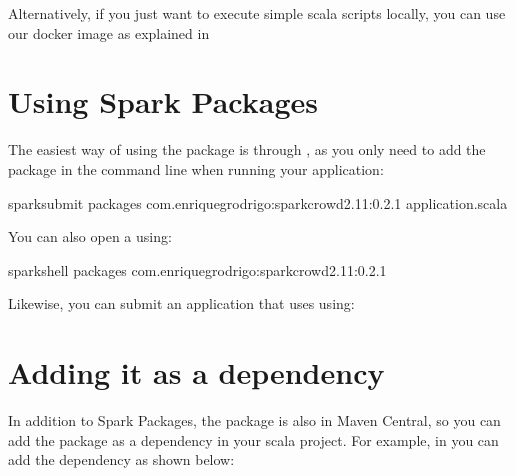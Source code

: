 \documentclass[letterpaper,10pt,english]{sphinxmanual}
\begin{document}
Alternatively, if you just want to execute simple scala scripts locally,
you can use our docker image as explained in {\hyperref[\detokenize{usage/quickstart:quickstart}]{}}


\section{Using Spark Packages}
\label{\detokenize{usage/installation:using-spark-packages}}
The easiest way of using the package is through , as you only need to add the package in the command line when running your
application:

%
\begin{sphinxVerbatim}[commandchars=\\\{\}]
spark\PYGZhy{}submit \PYGZhy{}\PYGZhy{}packages com.enriquegrodrigo:spark\PYGZhy{}crowd\PYGZus{}2.11:0.2.1 application.scala
\end{sphinxVerbatim}

You can also open a  using:

%
\begin{sphinxVerbatim}[commandchars=\\\{\}]
spark\PYGZhy{}shell \PYGZhy{}\PYGZhy{}packages com.enriquegrodrigo:spark\PYGZhy{}crowd\PYGZus{}2.11:0.2.1
\end{sphinxVerbatim}

Likewise, you can submit an application that uses  using:


\section{Adding it as a dependency}
\label{\detokenize{usage/installation:adding-it-as-a-dependency}}
In addition to Spark Packages, the package is also in Maven Central, so you can add the package as a dependency in your scala project.
For example, in  you can add the dependency as shown below:

%
\begin{sphinxVerbatim}[commandchars=\\\{\}]
      
\end{sphinxVerbatim}
\end{document}
